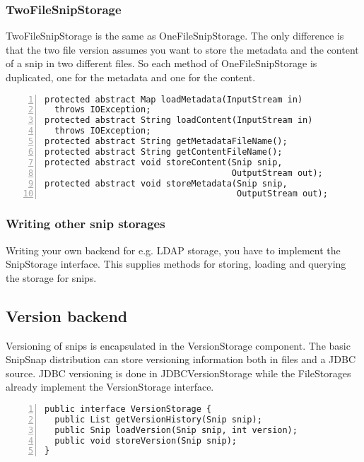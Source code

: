 \documentclass[a4paper,pdftex]{article}
\begin{document}
\subsubsection{TwoFileSnipStorage}

TwoFileSnipStorage is the same as OneFileSnipStorage. The only difference
is that the two file version assumes you want to store the metadata and the
content of a snip in two different files. So each method of OneFileSnipStorage
is duplicated, one for the metadata and one for the content.

\begin{Verbatim}[gobble=0,frame=single,numbers=left,fontsize=\small]
protected abstract Map loadMetadata(InputStream in) 
  throws IOException;
protected abstract String loadContent(InputStream in)
  throws IOException;
protected abstract String getMetadataFileName();
protected abstract String getContentFileName();
protected abstract void storeContent(Snip snip, 
                                     OutputStream out);
protected abstract void storeMetadata(Snip snip, 
                                      OutputStream out);
\end{Verbatim}

\subsubsection{Writing other snip storages}

Writing your own backend for e.g. LDAP storage, you have
to implement the SnipStorage interface. This supplies methods
for storing, loading and querying the storage for snips.

\subsection{Version backend}

Versioning of snips is encapsulated in the VersionStorage component.
The basic SnipSnap distribution can store versioning information
both in files and a JDBC source. JDBC versioning is done in JDBCVersionStorage
while the FileStorages already implement the VersionStorage interface.

\begin{Verbatim}[gobble=0,frame=single,numbers=left,fontsize=\small]
public interface VersionStorage {
  public List getVersionHistory(Snip snip);
  public Snip loadVersion(Snip snip, int version);
  public void storeVersion(Snip snip);
}
\end{Verbatim}
\end{document}
